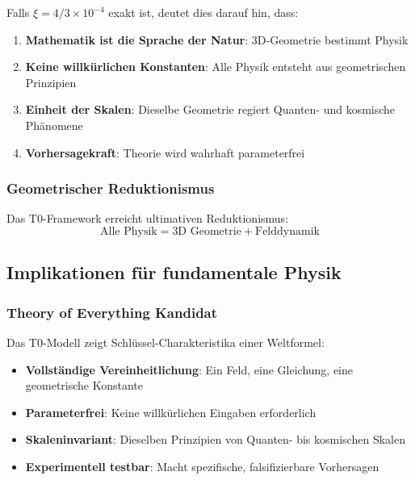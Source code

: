 	Falls $\xi = 4/3 \times 10^{-4}$ exakt ist, deutet dies darauf hin, dass:
	
	\begin{enumerate}
		\item \textbf{Mathematik ist die Sprache der Natur}: 3D-Geometrie bestimmt Physik
		\item \textbf{Keine willkürlichen Konstanten}: Alle Physik entsteht aus geometrischen Prinzipien
		\item \textbf{Einheit der Skalen}: Dieselbe Geometrie regiert Quanten- und kosmische Phänomene
		\item \textbf{Vorhersagekraft}: Theorie wird wahrhaft parameterfrei
	\end{enumerate}
	
	\subsubsection{Geometrischer Reduktionismus}
	\label{subsubsec:geometrischer_reduktionismus}
	
	Das T0-Framework erreicht ultimativen Reduktionismus:
	\begin{equation}
		\boxed{\text{Alle Physik} = \text{3D Geometrie} + \text{Felddynamik}}
		\label{eq:ultimativer_reduktionismus}
	\end{equation}
	
	\subsection{Implikationen für fundamentale Physik}
	\label{subsec:fundamentale_physik}
	
	\subsubsection{Theory of Everything Kandidat}
	\label{subsubsec:toe_kandidat}
	
	Das T0-Modell zeigt Schlüssel-Charakteristika einer Weltformel:
	\begin{itemize}
		\item \textbf{Vollständige Vereinheitlichung}: Ein Feld, eine Gleichung, eine geometrische Konstante
		\item \textbf{Parameterfrei}: Keine willkürlichen Eingaben erforderlich
		\item \textbf{Skaleninvariant}: Dieselben Prinzipien von Quanten- bis kosmischen Skalen
		\item \textbf{Experimentell testbar}: Macht spezifische, falsifizierbare Vorhersagen
	\end{itemize}
	
